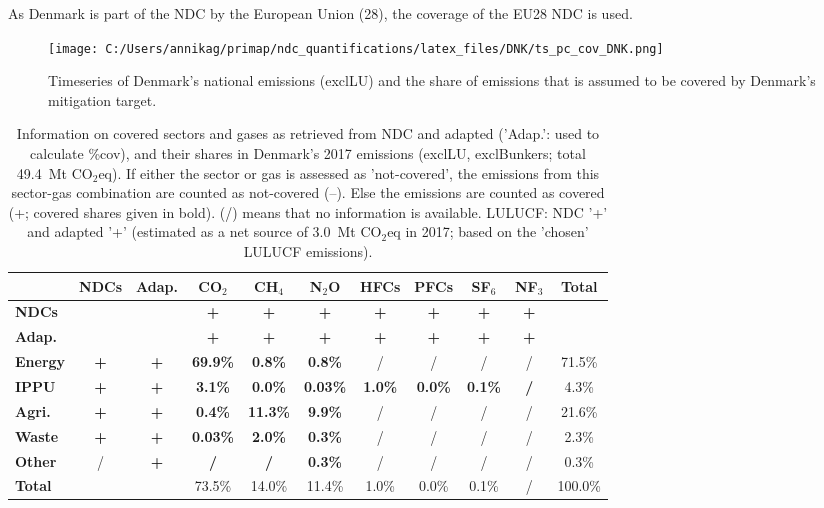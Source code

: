 \documentclass[12pt]{article}
\begin{document}
 As Denmark is part of the NDC by the European Union (28), the coverage of the EU28 NDC is used.

 \begin{figure}[H]
 \centering
 \texttt{[image: C:/Users/annikag/primap/ndc\_quantifications/latex\_files/DNK/ts\_pc\_cov\_DNK.png]}
 \caption{Timeseries of Denmark's national emissions (exclLU) and the share of emissions that is assumed to be covered by Denmark's mitigation target.}
 \label{fig:tsPcCov}
 \end{figure}

 \begin{table}[H]\small
 \centering
 \caption{Information on covered sectors and gases as retrieved from NDC and adapted ('Adap.': used to calculate \%cov), and their shares in Denmark's 2017 emissions (exclLU, exclBunkers; total 49.4~Mt CO$_2$eq).
 If either the sector or gas is assessed as 'not-covered', the emissions from this sector-gas combination are counted as not-covered (--). 
 Else the emissions are counted as covered (+; covered shares given in bold).
 (/) means that no information is available.
 LULUCF: NDC '+' and adapted '+' (estimated as a net source of 3.0~Mt CO$_2$eq in 2017; based on the 'chosen' LULUCF emissions).}
 \label{tab:coveredSectorsGases}
 \begin{tabular}{l || c c || c c c c c c c | c}
 \bfseries  & \bfseries NDCs & \bfseries Adap. & \bfseries CO$_2$ & \bfseries CH$_4$ & \bfseries N$_2$O & \bfseries HFCs & \bfseries PFCs & \bfseries SF$_6$ & \bfseries NF$_3$ & \bfseries Total \tabularnewline \hline \hline
 \bfseries NDCs &  &  & \bfseries + & \bfseries + & \bfseries + & \bfseries + & \bfseries + & \bfseries + & \bfseries + &  \tabularnewline 
 \bfseries Adap. &  &  & \bfseries + & \bfseries + & \bfseries + & \bfseries + & \bfseries + & \bfseries + & \bfseries + &  \tabularnewline \hline \hline
 \bfseries Energy & \bfseries + & \bfseries + & \bfseries 69.9\% & \bfseries 0.8\% & \bfseries 0.8\% & / & / & / & / & 71.5\% \tabularnewline 
 \bfseries IPPU & \bfseries + & \bfseries + & \bfseries 3.1\% & \bfseries 0.0\% & \bfseries 0.03\% & \bfseries 1.0\% & \bfseries 0.0\% & \bfseries 0.1\% & \bfseries / & 4.3\% \tabularnewline 
 \bfseries Agri. & \bfseries + & \bfseries + & \bfseries 0.4\% & \bfseries 11.3\% & \bfseries 9.9\% & / & / & / & / & 21.6\% \tabularnewline 
 \bfseries Waste & \bfseries + & \bfseries + & \bfseries 0.03\% & \bfseries 2.0\% & \bfseries 0.3\% & / & / & / & / & 2.3\% \tabularnewline 
 \bfseries Other & / & \bfseries + & \bfseries / & \bfseries / & \bfseries 0.3\% & / & / & / & / & 0.3\% \tabularnewline \hline
 \bfseries Total &  &  & 73.5\% & 14.0\% & 11.4\% & 1.0\% & 0.0\% & 0.1\% & / & 100.0\% \tabularnewline 
 \end{tabular}
 \end{table}
\end{document}
